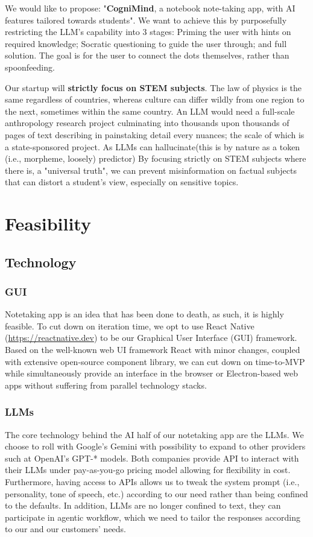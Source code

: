 We would like to propose: "\textbf{CogniMind}, a notebook note-taking app, with AI features tailored towards students".
We want to achieve this by purposefully restricting the LLM's capability into 3 stages: Priming the user with hints on
required knowledge; Socratic questioning to guide the user through; and full solution. The goal is for the user to
connect the dots themselves, rather than spoonfeeding.

Our startup will \textbf{strictly focus on STEM subjects}. The law of physics is the same regardless of countries,
whereas culture can differ wildly from one region to the next, sometimes within the same country. An LLM would need a
full-scale anthropology research project culminating into thousands upon thousands of pages of text describing in
painstaking detail every nuances; the scale of which is a state-sponsored project. As LLMs can hallucinate(this is by
nature as a token (i.e., morpheme, loosely) predictor) By focusing strictly on STEM subjects where there is,
a "universal truth", we can prevent misinformation on factual subjects that can distort a student's view, especially on
sensitive topics.

\section{Feasibility}

\subsection{Technology}
\subsubsection{GUI}
Notetaking app is an idea that has been done to death, as such, it is highly feasible. To cut down on
 iteration time, we opt to use React Native (\url{https://reactnative.dev}) to be our Graphical User Interface
 (GUI) framework. Based on the well-known web UI framework React with minor changes, coupled with extensive open-source
 component library, we can cut down on time-to-MVP while simultaneously provide an interface in the browser or
 Electron-based web apps without suffering from parallel technology stacks.

\subsubsection{LLMs}
The core technology behind the AI half of our notetaking app are the LLMs. We choose to roll with
 Google's Gemini with possibility to expand to other providers such at OpenAI's GPT-* models. Both companies provide
 API to interact with their LLMs under pay-as-you-go pricing model allowing for flexibility in cost. Furthermore,
 having access to APIs allows us to tweak the system prompt (i.e., personality, tone of speech, etc.) according to our
 need rather than being confined to the defaults. In addition, LLMs are no longer confined to text, they can
 participate in agentic workflow, which we need to tailor the responses according to our and our customers' needs.

